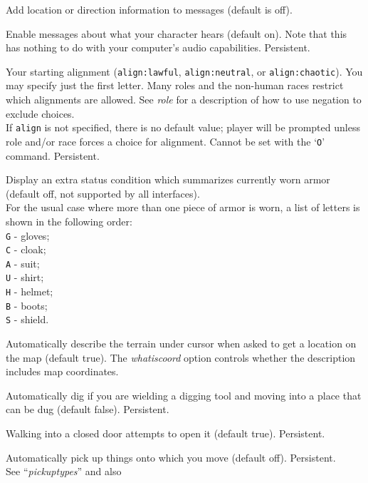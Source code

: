 \documentclass[titlepage]{article}
\begin{document}
\begin{description}[font=\mdseries\itshape]
\item[accessiblemsg]
Add location or direction information to messages (default is off).
\item[acoustics]
Enable messages about what your character hears (default on).
Note that this has nothing to do with your computer's audio capabilities.
Persistent.
\item[alignment]
Your starting alignment (\texttt{align:lawful}, \texttt{align:neutral},
or \texttt{align:chaotic}).
You may specify just the first letter.
Many roles and the non-human races restrict which alignments are allowed.
See \textit{role}
for a description of how to use negation to exclude choices.
\\
If \texttt{align} is not specified, there is no default value;
player will be prompted unless role and/or race forces a choice for alignment.
Cannot be set with the `\texttt{O}' command.  Persistent.
\item[armorstatus]
Display an extra status condition which summarizes currently worn armor
(default off, not supported by all interfaces).
\\
For the usual case where more than one piece of armor is worn, a list of
letters is shown in the following order:
\\
\texttt{G} - gloves;\\
\texttt{C} - cloak;\\
\texttt{A} - suit;\\
\texttt{U} - shirt;\\
\texttt{H} - helmet;\\
\texttt{B} - boots;\\
\texttt{S} - shield.
\item[autodescribe]
Automatically describe the terrain under cursor when asked to get a location
on the map (default true).
The \textit{whatis\textunderscore coord}
option controls whether the description includes map coordinates.
\item[autodig]
Automatically dig if you are wielding a digging tool and moving into a place
that can be dug (default false).  Persistent.
\item[autoopen]
Walking into a closed door attempts to open it (default true).
Persistent.
\item[autopickup]
Automatically pick up things onto which you move (default off).
Persistent.
\\
See ``\textit{pickup\textunderscore types}'' and also

\end{description}
\end{document}
